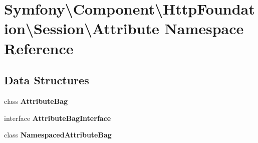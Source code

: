 \section{Symfony\textbackslash{}Component\textbackslash{}Http\+Foundation\textbackslash{}Session\textbackslash{}Attribute Namespace Reference}
\label{namespace_symfony_1_1_component_1_1_http_foundation_1_1_session_1_1_attribute}
\subsection*{Data Structures}
\begin{DoxyCompactItemize}
\item 
class {\bf Attribute\+Bag}
\item 
interface {\bf Attribute\+Bag\+Interface}
\item 
class {\bf Namespaced\+Attribute\+Bag}
\end{DoxyCompactItemize}
